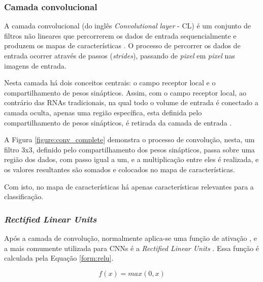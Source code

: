 \subsubsection{Camada convolucional}

\par A camada convolucional (do inglês \textit{Convolutional layer} - CL) é um conjunto de filtros não lineares que percorrerem os dados de entrada sequencialmente e produzem os mapas de características \cite{Miyazaki2017}. O processo de percorrer os dados de entrada ocorrer através de passos (\textit{strides}), passando de \textit{pixel} em \textit{pixel} nas imagens de entrada.

\par Nesta camada há dois conceitos centrais: o campo receptor local e o compartilhamento de pesos sinápticos. Assim, com o campo receptor local, ao contrário das RNAs tradicionais, na qual todo o volume de entrada é conectado a camada oculta, apenas uma região específica, esta definida pelo compartilhamento de pesos sinápticos, é retirada da camada de entrada \cite{mnielsen2018}.

\par A Figura \ref{figure:conv_complete} demonstra o processo de convolução, nesta, um filtro 3x3, definido pelo compartilhamento dos pesos sinápticos, passa sobre uma região dos dados, com passo igual a um, e a multiplicação entre eles é realizada, e os valores resultantes são somados e colocados no mapa de características.


\par Com isto, no mapa de características há apenas características relevantes para a classificação.

\subsubsection{\textit{Rectified Linear Units}}

\par Após a camada de convolução, normalmente aplica-se uma função de ativação \cite{Carneiro2017}, e a mais comumente utilizada para CNNs é a \textit{Rectified Linear Units} \cite{nair2010, Krizhevsky2012}. Essa função é calculada pela Equação \ref{form:relu}.

\begin{equation}
    f(x) = max(0, x)
\label{form:relu}
\end{equation}

